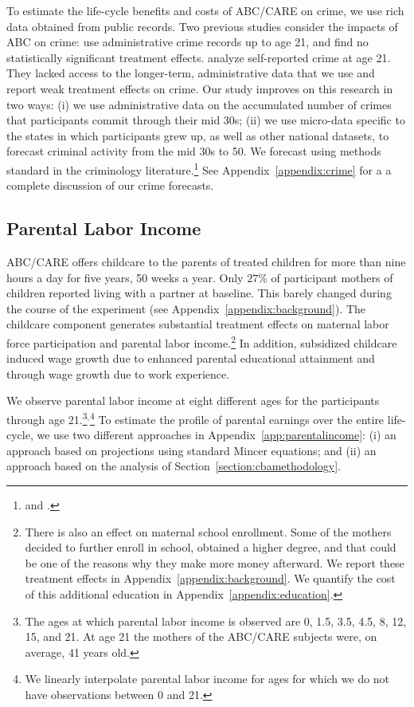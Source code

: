 \noindent To estimate the life-cycle benefits and costs of ABC/CARE on crime, we use rich data obtained from public records. Two previous studies consider the impacts of ABC on crime: \citet{Clarke_Campbell_1998_ABC_Comparison_ECRQ} use administrative crime records up to age 21, and find no statistically significant treatment effects. \cite{Barnett_Masse_2002_benefitcost,Barnett_Masse_2007_EER} analyze self-reported crime at age 21. They lacked access to the longer-term, administrative data that we use and report weak treatment effects on crime. Our study improves on this research in two ways: (i) we use administrative data on the accumulated number of crimes that participants commit through their mid 30s; (ii) we use micro-data specific to the states in which participants grew up, as well as other national datasets, to forecast criminal activity from the mid 30s to 50. We forecast using methods standard in the criminology literature.\footnote{\citet{Cohen-Bowles_2010_Estimating-Cost-Crime} and \citet{McCollister_etal_2010_DAD}.} See Appendix~\ref{appendix:crime} for a a complete discussion of our crime forecasts.

\subsection{Parental Labor Income} \label{section:pincome}

\noindent ABC/CARE offers childcare to the parents of treated children for more than nine hours a day for five years, 50 weeks a year. Only $27\%$ of participant mothers of children reported living with a partner at baseline. This barely changed during the course of the experiment (see Appendix~\ref{appendix:background}). The childcare component generates substantial treatment effects on maternal labor force participation and parental labor income.\footnote{There is also an effect on maternal school enrollment. Some of the mothers decided to further enroll in school, obtained a higher degree, and that could be one of the reasons why they make more money afterward. We report these treatment effects in Appendix~\ref{appendix:background}. We quantify the cost of this additional education in Appendix~\ref{appendix:education}.} In addition, subsidized childcare induced wage growth due to enhanced parental educational attainment and through wage growth due to work experience.

We observe parental labor income at eight different ages for the participants through age 21.\footnote{The ages at which parental labor income is observed are 0, 1.5, 3.5, 4.5, 8, 12, 15, and 21. At age 21 the mothers of the ABC/CARE subjects were, on average, 41 years old.}$^,$\footnote{We linearly interpolate parental labor income for ages for which we do not have observations between 0 and 21.} To estimate the profile of parental earnings over the entire life-cycle, we use two different approaches in Appendix~\ref{app:parentalincome}: (i) an approach based on projections using standard Mincer equations; and (ii) an approach based on the analysis of Section~\ref{section:cbamethodology}.

